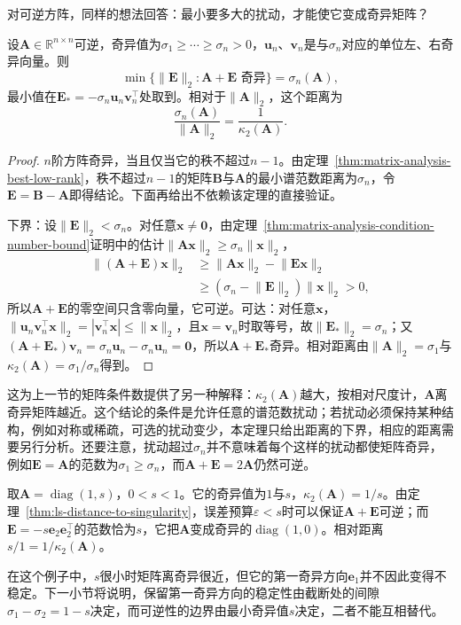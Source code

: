 对可逆方阵，同样的想法回答：最小要多大的扰动，才能使它变成奇异矩阵？
\begin{theorem}[到奇异矩阵的距离]
\label{thm:ls-distance-to-singularity}
设$\bm A\in\mathbb R^{n\times n}$可逆，奇异值为$\sigma_1\geq\cdots\geq\sigma_n>0$，$\bm u_n$、$\bm v_n$是与$\sigma_n$对应的单位左、右奇异向量。则
\[
 \min\{\lVert\bm E\rVert_2:\bm A+\bm E\text{ 奇异}\}=\sigma_n(\bm A),
\]
最小值在$\bm E_*=-\sigma_n\bm u_n\bm v_n^\top$处取到。相对于$\lVert\bm A\rVert_2$，这个距离为
\[
 \frac{\sigma_n(\bm A)}{\lVert\bm A\rVert_2}=\frac1{\kappa_2(\bm A)} .
\]
\end{theorem}
\begin{proof}
$n$阶方阵奇异，当且仅当它的秩不超过$n-1$。由定理~\ref{thm:matrix-analysis-best-low-rank}，秩不超过$n-1$的矩阵$\bm B$与$\bm A$的最小谱范数距离为$\sigma_n$，令$\bm E=\bm B-\bm A$即得结论。下面再给出不依赖该定理的直接验证。

下界：设$\lVert\bm E\rVert_2<\sigma_n$。对任意$\bm x\neq\bm0$，由定理~\ref{thm:matrix-analysis-condition-number-bound}证明中的估计$\lVert\bm A\bm x\rVert_2\geq\sigma_n\lVert\bm x\rVert_2$，
\[
 \begin{aligned}
 \lVert(\bm A+\bm E)\bm x\rVert_2
 &\geq\lVert\bm A\bm x\rVert_2-\lVert\bm E\bm x\rVert_2\\
 &\geq(\sigma_n-\lVert\bm E\rVert_2)\lVert\bm x\rVert_2>0 ,
 \end{aligned}
\]
所以$\bm A+\bm E$的零空间只含零向量，它可逆。可达：对任意$\bm x$，$\lVert\bm u_n\bm v_n^\top\bm x\rVert_2=|\bm v_n^\top\bm x|\leq\lVert\bm x\rVert_2$，且$\bm x=\bm v_n$时取等号，故$\lVert\bm E_*\rVert_2=\sigma_n$；又$(\bm A+\bm E_*)\bm v_n=\sigma_n\bm u_n-\sigma_n\bm u_n=\bm0$，所以$\bm A+\bm E_*$奇异。相对距离由$\lVert\bm A\rVert_2=\sigma_1$与$\kappa_2(\bm A)=\sigma_1/\sigma_n$得到。
\end{proof}
这为上一节的矩阵条件数提供了另一种解释：$\kappa_2(\bm A)$越大，按相对尺度计，$\bm A$离奇异矩阵越近。这个结论的条件是允许任意的谱范数扰动；若扰动必须保持某种结构，例如对称或稀疏，可选的扰动变少，本定理只给出距离的下界，相应的距离需要另行分析。还要注意，扰动超过$\sigma_n$并不意味着每个这样的扰动都使矩阵奇异，例如$\bm E=\bm A$的范数为$\sigma_1\geq\sigma_n$，而$\bm A+\bm E=2\bm A$仍然可逆。

\begin{example}[对角矩阵的可逆性边界]
\label{ex:ls-diagonal-distance-to-singularity}
取$\bm A=\operatorname{diag}(1,s)$，$0<s<1$。它的奇异值为$1$与$s$，$\kappa_2(\bm A)=1/s$。由定理~\ref{thm:ls-distance-to-singularity}，误差预算$\varepsilon<s$时可以保证$\bm A+\bm E$可逆；而$\bm E=-s\bm e_2\bm e_2^\top$的范数恰为$s$，它把$\bm A$变成奇异的$\operatorname{diag}(1,0)$。相对距离$s/1=1/\kappa_2(\bm A)$。
\end{example}
在这个例子中，$s$很小时矩阵离奇异很近，但它的第一奇异方向$\bm e_1$并不因此变得不稳定。下一小节将说明，保留第一奇异方向的稳定性由截断处的间隙$\sigma_1-\sigma_2=1-s$决定，而可逆性的边界由最小奇异值$s$决定，二者不能互相替代。

